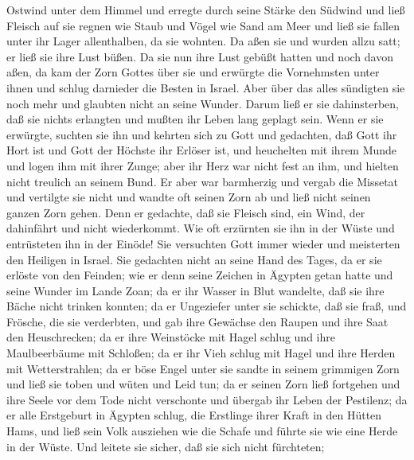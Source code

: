 Ostwind unter dem Himmel und erregte durch seine Stärke den Südwind
 und ließ Fleisch auf sie regnen wie Staub und Vögel wie
Sand am Meer  und ließ sie fallen unter ihr Lager
allenthalben, da sie wohnten.  Da aßen sie und wurden allzu
satt; er ließ sie ihre Lust büßen.  Da sie nun ihre Lust
gebüßt hatten und noch davon aßen,  da kam der Zorn Gottes
über sie und erwürgte die Vornehmsten unter ihnen und schlug darnieder
die Besten in Israel.  Aber über das alles sündigten sie
noch mehr und glaubten nicht an seine Wunder.  Darum ließ
er sie dahinsterben, daß sie nichts erlangten und mußten ihr Leben lang
geplagt sein.  Wenn er sie erwürgte, suchten sie ihn und
kehrten sich zu Gott  und gedachten, daß Gott ihr Hort ist
und Gott der Höchste ihr Erlöser ist,  und heuchelten mit
ihrem Munde und logen ihm mit ihrer Zunge;  aber ihr Herz
war nicht fest an ihm, und hielten nicht treulich an seinem Bund.
 Er aber war barmherzig und vergab die Missetat und
vertilgte sie nicht und wandte oft seinen Zorn ab und ließ nicht seinen
ganzen Zorn gehen.  Denn er gedachte, daß sie Fleisch sind,
ein Wind, der dahinfährt und nicht wiederkommt.  Wie oft
erzürnten sie ihn in der Wüste und entrüsteten ihn in der Einöde!
 Sie versuchten Gott immer wieder und meisterten den
Heiligen in Israel.  Sie gedachten nicht an seine Hand des
Tages, da er sie erlöste von den Feinden;  wie er denn
seine Zeichen in Ägypten getan hatte und seine Wunder im Lande Zoan;
 da er ihr Wasser in Blut wandelte, daß sie ihre Bäche
nicht trinken konnten;  da er Ungeziefer unter sie
schickte, daß sie fraß, und Frösche, die sie verderbten, 
und gab ihre Gewächse den Raupen und ihre Saat den Heuschrecken;
 da er ihre Weinstöcke mit Hagel schlug und ihre
Maulbeerbäume mit Schloßen;  da er ihr Vieh schlug mit
Hagel und ihre Herden mit Wetterstrahlen;  da er böse Engel
unter sie sandte in seinem grimmigen Zorn und ließ sie toben und wüten
und Leid tun;  da er seinen Zorn ließ fortgehen und ihre
Seele vor dem Tode nicht verschonte und übergab ihr Leben der Pestilenz;
 da er alle Erstgeburt in Ägypten schlug, die Erstlinge
ihrer Kraft in den Hütten Hams,  und ließ sein Volk
ausziehen wie die Schafe und führte sie wie eine Herde in der Wüste.
 Und leitete sie sicher, daß sie sich nicht fürchteten;
